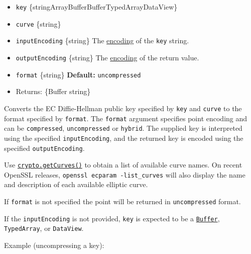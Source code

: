 \begin{itemize}
\tightlist
\item
  \texttt{key}
  \{string\textbar ArrayBuffer\textbar Buffer\textbar TypedArray\textbar DataView\}
\item
  \texttt{curve} \{string\}
\item
  \texttt{inputEncoding} \{string\} The
  \href{buffer.md\#buffers-and-character-encodings}{encoding} of the
  \texttt{key} string.
\item
  \texttt{outputEncoding} \{string\} The
  \href{buffer.md\#buffers-and-character-encodings}{encoding} of the
  return value.
\item
  \texttt{format} \{string\} \textbf{Default:}
  \texttt{\textquotesingle{}uncompressed\textquotesingle{}}
\item
  Returns: \{Buffer \textbar{} string\}
\end{itemize}

Converts the EC Diffie-Hellman public key specified by \texttt{key} and
\texttt{curve} to the format specified by \texttt{format}. The
\texttt{format} argument specifies point encoding and can be
\texttt{\textquotesingle{}compressed\textquotesingle{}},
\texttt{\textquotesingle{}uncompressed\textquotesingle{}} or
\texttt{\textquotesingle{}hybrid\textquotesingle{}}. The supplied key is
interpreted using the specified \texttt{inputEncoding}, and the returned
key is encoded using the specified \texttt{outputEncoding}.

Use \hyperref[cryptogetcurves]{\texttt{crypto.getCurves()}} to obtain a
list of available curve names. On recent OpenSSL releases,
\texttt{openssl\ ecparam\ -list\_curves} will also display the name and
description of each available elliptic curve.

If \texttt{format} is not specified the point will be returned in
\texttt{\textquotesingle{}uncompressed\textquotesingle{}} format.

If the \texttt{inputEncoding} is not provided, \texttt{key} is expected
to be a \href{buffer.md}{\texttt{Buffer}}, \texttt{TypedArray}, or
\texttt{DataView}.

Example (uncompressing a key):

